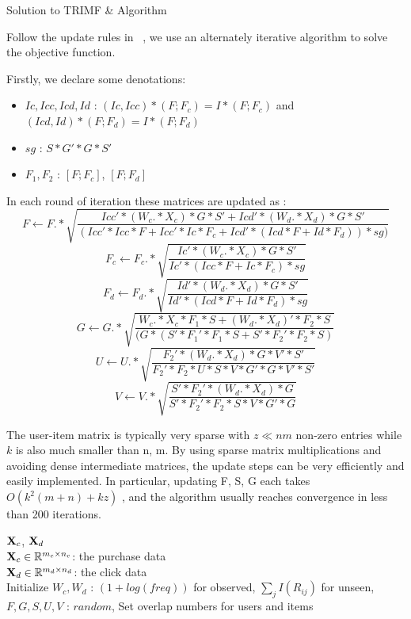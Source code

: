 \begin{section}
  {Solution to TRIMF \& Algorithm}
\par{Follow the update rules in ~\cite{Zhuang:2011:EAW:1952191.1952195}, we use an alternately iterative algorithm to solve the objective function.}

Firstly, we declare some denotations:
\begin{itemize}
	\item $Ic,Icc,Icd,Id$ : $(Ic,Icc)*(F;F_c) = I*(F;F_c)$ and $(Icd,Id)*(F;F_d) = I*(F;F_d)$
	\item $sg$ : $S*G'*G*S'$
	\item $F_1, F_2$ : $[F;F_c]$, $[F;F_d]$
\end{itemize}
\par{In each round of iteration these matrices are updated as :
$$F \leftarrow F .* \sqrt{\frac{Icc'*(W_c.*X_c)*G*S' + Icd'*(W_d.*X_d)*G*S'}{(Icc'*Icc*F + Icc'*Ic*F_c + Icd'*(Icd*F + Id*F_d))*sg)}}$$
$$F_c \leftarrow F_c .* \sqrt{\frac{Ic'*(W_c.*X_c)*G*S'}{Ic'*(Icc*F + Ic*F_c)*sg}}$$
$$F_d \leftarrow F_d .* \sqrt{\frac{Id'*(W_d.*X_d)*G*S'}{Id'*(Icd*F + Id*F_d)*sg }}$$
$$G \leftarrow G .* \sqrt{\frac{W_c.*X_c*F_1*S + (W_d.*X_d)'*F_2*S}{(G*(S'*F_1'*F_1*S + S'*F_2'*F_2*S)}}$$
$$U \leftarrow U .* \sqrt{\frac{F_2'*(W_d.*X_d)*G*V'*S'}{F_2'*F_2*U*S*V*G'*G*V'*S'}}$$
$$V \leftarrow V .* \sqrt{\frac{S'*F_2'*(W_d.*X_d)*G}{S'*F_2'*F_2*S*V*G'*G}} $$



}

\par{The user-item matrix is typically very sparse with $z \ll nm$ non-zero entries while $k$ is also much smaller than n, m. By using sparse matrix multiplications and avoiding dense intermediate matrices, the update steps can be very efficiently and easily implemented. In particular, updating F, S, G each takes $O(k^2 (m + n) + kz)$ , and the algorithm usually reaches convergence in less than 200 iterations.}

\begin{algorithm}[tb]
\caption{Algorithm for TRIMF.}
\begin{algorithmic}

 $\mathbf{X}_{c}$, $\mathbf{X}_{d}$\\
$\mathbf{X}_{c} \in \mathbb{R}^{m_c\times n_c}$: the purchase data \\
$\mathbf{X}_{d} \in \mathbb{R}^{m_d\times n_d}$: the click data\\

 Initialize $W_c, W_d$ : $(1+log(freq))$ for observed, $\sum_jI({R_{ij}})$ for unseen, $F,G,S,U,V$ : $random$, Set overlap numbers for users and items


\end{algorithmic}
\end{algorithm}
\end{section}
